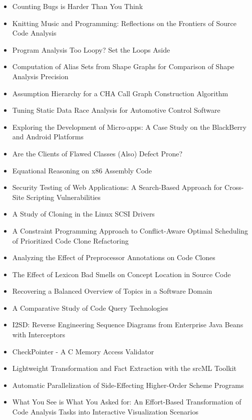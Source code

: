 {\small
\begin{itemize}[itemsep=-1ex]
  \item Counting Bugs is Harder Than You Think {\color{blue} \checkmark}{\color{red} \texttimes}
  \item Knitting Music and Programming: Reflections on the Frontiers of Source Code Analysis
  \item Program Analysis Too Loopy? Set the Loops Aside
  \item Computation of Alias Sets from Shape Graphs for Comparison of Shape Analysis Precision {\color{blue} \checkmark}{\color{red} \texttimes}
  \item Assumption Hierarchy for a CHA Call Graph Construction Algorithm
  \item Tuning Static Data Race Analysis for Automotive Control Software {\color{blue} \checkmark}{\color{red} \texttimes}
  \item Exploring the Development of Micro-apps: A Case Study on the BlackBerry and Android Platforms
  \item Are the Clients of Flawed Classes (Also) Defect Prone?
  \item Equational Reasoning on x86 Assembly Code {\color{blue} \checkmark}{\color{red} \texttimes}
  \item Security Testing of Web Applications: A Search-Based Approach for Cross-Site Scripting Vulnerabilities {\color{blue} \checkmark}{\color{red} \texttimes}
  \item A Study of Cloning in the Linux SCSI Drivers {\color{blue} \checkmark}{\color{red} \texttimes}
  \item A Constraint Programming Approach to Conflict-Aware Optimal Scheduling of Prioritized Code Clone Refactoring
  \item Analyzing the Effect of Preprocessor Annotations on Code Clones
  \item The Effect of Lexicon Bad Smells on Concept Location in Source Code
  \item Recovering a Balanced Overview of Topics in a Software Domain {\color{blue} \checkmark}{\color{red} \texttimes}
  \item A Comparative Study of Code Query Technologies
  \item I2SD: Reverse Engineering Sequence Diagrams from Enterprise Java Beans with Interceptors {\color{blue} \checkmark}{\color{blue} \checkmark}
  \item CheckPointer - A C Memory Access Validator
  \item Lightweight Transformation and Fact Extraction with the srcML Toolkit {\color{blue} \checkmark}{\color{blue} \checkmark}
  \item Automatic Parallelization of Side-Effecting Higher-Order Scheme Programs {\color{blue} \checkmark}{\color{red} \texttimes}
  \item What You See is What You Asked for: An Effort-Based Transformation of Code Analysis Tasks into Interactive Visualization Scenarios
\end{itemize}
}

